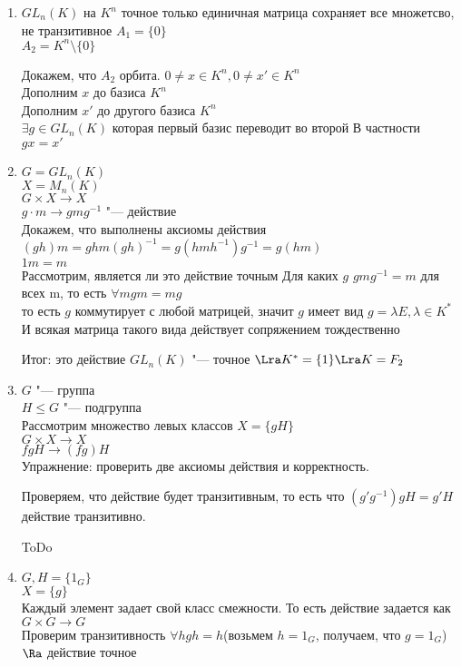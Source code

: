 \begin{exmp}\hfill
\begin{enumerate}
\item $GL_n(K)$ на $K^n$
точное только единичная матрица сохраняет все множетсво, не транзитивное
$A_1 = \{0\}$\\
$A_2 = K^n\setminus \{0\}$

Докажем, что $A_2$ орбита.
$0 \ne x \in K^{n}, 0 \ne x' \in K^n$\\
Дополним $x$ до базиса $K^n$\\
Дополним $x'$ до другого базиса $K^n$\\
$\exists g\in GL_n(K)$ которая первый базис переводит во второй
В частности $gx = x'$\\
\item 
$G = GL_n(K)$ \\
$X = M_n(K)$ \\
$G \times X \to X$ \\
$g \cdot m \to gmg^{-1}$ "--- действие\\
Докажем, что выполнены аксиомы действия\\
$(gh)m = ghm(gh)^{-1} = g(hmh^{-1})g^{-1} = g(hm)$\\
$1m = m$\\

Рассмотрим, является ли это действие точным 
Для каких $g$ $gmg^{-1} = m$ для всех m, то есть $\forall m gm = mg$\\
то есть $g$ коммутирует с любой матрицей, значит $g$ имеет вид 
$g = \lambda E, \lambda \in K^{*}$\\
И всякая матрица такого вида действует сопряжением тождественно

Итог: это действие $GL_n(K)$  "--- точное $\Lra K^* = \{1\} \Lra K = F_2$ \\
\item
$G$ "--- группа \\
$H \le G$ "--- подгруппа\\
Рассмотрим множество левых классов $X = \{gH\}$\\
$G \times X \to X$\\
$f gH \to (fg)H$\\
Упражнение: проверить две аксиомы действия и корректность. 

Проверяем, что действие будет транзитивным, то есть что 
$(g'g^{-1})gH = g'H$ действие транзитивно.

ToDo
\item
$G, H = \{1_G\}$\\
$X = \{g\}$\\
Каждый элемент задает свой класс смежности. 
То есть действие задается как 
$G \times G \to G$\\
Проверим транзитивность
$\forall h gh = h$(возьмем $h = 1_G$, получаем, что $g = 1_G$)\\
$\Ra$ действие точное


\end{enumerate}
\end{exmp}
